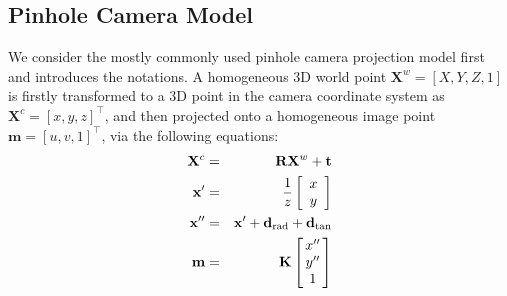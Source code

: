 \documentclass{report}
\begin{document}
\subsection{Pinhole Camera Model}
We consider the mostly commonly used pinhole camera projection model first and introduces the notations. A homogeneous 3D world point $\mathbf{X}^w = [X, Y, Z, 1]$ is firstly transformed to a 3D point in the camera coordinate system as $\mathbf{X}^c = [x, y, z]^\top$, and then projected onto a homogeneous image point $\mathbf{m} = [u, v, 1]^\top$, via the following equations: 
\begin{eqnarray}
\label{cmEqn1}
\mathbf{X}^c &=&
\mathbf{R} \mathbf{X}^w + \mathbf{t} \\
\mathbf{x}' &=& \frac{1}{z} 
\begin{bmatrix}
\begin{array}{c}
x \\ y
\end{array}
\end{bmatrix} \\
\mathbf{x}'' &=& \mathbf{x}' + \mathbf{d}_\text{rad} + \mathbf{d}_\text{tan} \\
\mathbf{m} &=&
\mathbf{K}
\arraycolsep=1.5pt%
\begin{bmatrix}
	\begin{array}{c}
	x'' \\ y'' \\ 1
	\end{array}
\end{bmatrix}
\label{cmEqn4} 
\end{eqnarray}
\end{document}
